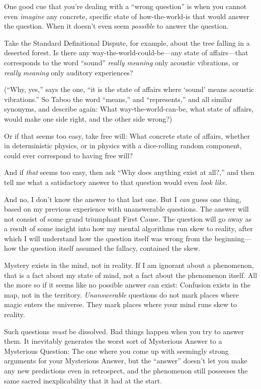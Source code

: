 {
 One good cue that you're dealing with a
``wrong question'' is when you
cannot even \textit{imagine} any concrete, specific state of
how-the-world-is that would answer the question. When it
doesn't even seem \textit{possible} to answer the
question.}

{
 Take the Standard Definitional Dispute, for example, about the
tree falling in a deserted forest. Is there any
way-the-world-could-be---any state of affairs---that corresponds to the
word ``sound'' \textit{really
meaning} only acoustic vibrations, or \textit{really} \textit{meaning}
only auditory experiences?}

{
 (``Why, yes,'' says the one,
``it is the state of affairs where
`sound' means acoustic
vibrations.'' So Taboo the word
``means,'' and
``represents,'' and all similar
synonyms, and describe again: What way-the-world-can-be, what state of
affairs, would make one side right, and the other side wrong?)}

{
 Or if that seems too easy, take free will: What concrete state of
affairs, whether in deterministic physics, or in physics with a
dice-rolling random component, could ever correspond to having free
will?}

{
 And if \textit{that} seems too easy, then ask
``Why does anything exist at all?,''
and then tell me what a satisfactory answer to that question would even
\textit{look like.}}

{
 And no, I don't know the answer to that last one.
But I \textit{can} guess one thing, based on my previous experience
with unanswerable questions. The answer will not consist of some grand
triumphant First Cause. The question will go away as a result of some
insight into how my mental algorithms run skew to reality, after which
I will understand how the question itself was wrong from the
beginning---how the question itself assumed the fallacy, contained the
skew.}

{
 Mystery exists in the mind, not in reality. If I am ignorant about
a phenomenon, that is a fact about my state of mind, not a fact about
the phenomenon itself. All the more so if it seems like no possible
answer can exist: Confusion exists in the map, not in the territory.
\textit{Unanswerable} questions do not mark places where magic enters
the universe. They mark places where your mind runs skew to reality.}

{
 Such questions \textit{must} be dissolved. Bad things happen when
you try to answer them. It inevitably generates the worst sort of
Mysterious Answer to a Mysterious Question: The one where you come up
with seemingly strong arguments for your Mysterious Answer, but the
``answer'' doesn't
let you make any new predictions even in retrospect, and the phenomenon
still possesses the same sacred inexplicability that it had at the
start.}

